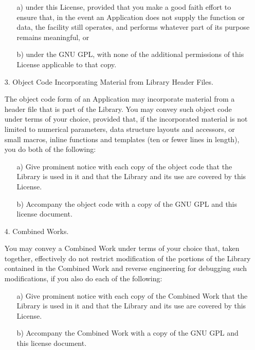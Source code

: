\documentclass[twocolumn,twoside,fleqn,12pt]{article}
\begin{document}
\begin{itemize}
   \begin{itemize}
   \item[a)] under this License, provided that you make a good faith effort to
   ensure that, in the event an Application does not supply the
   function or data, the facility still operates, and performs
   whatever part of its purpose remains meaningful, or

   \item[b)] under the GNU GPL, with none of the additional permissions of
   this License applicable to that copy.
   \end{itemize}

  \item[3.] Object Code Incorporating Material from Library Header Files.

  The object code form of an Application may incorporate material from
a header file that is part of the Library.  You may convey such object
code under terms of your choice, provided that, if the incorporated
material is not limited to numerical parameters, data structure
layouts and accessors, or small macros, inline functions and templates
(ten or fewer lines in length), you do both of the following:

   \begin{itemize}
   \item[a)] Give prominent notice with each copy of the object code that the
   Library is used in it and that the Library and its use are
   covered by this License.

   \item[b)] Accompany the object code with a copy of the GNU GPL and this
             license document.
   \end{itemize}

  \item[4.] Combined Works.

  You may convey a Combined Work under terms of your choice that,
taken together, effectively do not restrict modification of the
portions of the Library contained in the Combined Work and reverse
engineering for debugging such modifications, if you also do each of
the following:

   \begin{itemize}
   \item[a)] Give prominent notice with each copy of the Combined Work that
   the Library is used in it and that the Library and its use are
   covered by this License.

   \item[b)] Accompany the Combined Work with a copy of the GNU GPL and this license
   document.


\end{itemize}
\end{itemize}
\end{document}

